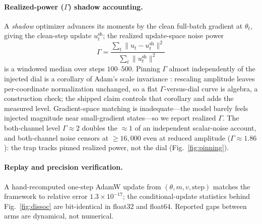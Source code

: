 \paragraph{Realized-power ($\Gamma$) shadow accounting.}
A \emph{shadow} optimizer advances its moments by the clean full-batch gradient at $\theta_t$, giving the clean-step update $u^{\mathrm{sh}}_t$; the realized update-space noise power
\[
\Gamma=\frac{\sum_t\lVert u_t-u^{\mathrm{sh}}_t\rVert^2}{\sum_t\lVert u^{\mathrm{sh}}_t\rVert^2}
\]
is a windowed median over steps $100$--$500$. Pinning $\Gamma$ almost independently of the injected dial is a corollary of Adam's scale invariance \citep{adam}: rescaling amplitude leaves per-coordinate normalization unchanged, so a flat $\Gamma$-versus-dial curve is algebra, a construction check; the shipped claim controls that corollary and adds the measured level. Gradient-space matching is inadequate---the model barely feels injected magnitude near small-gradient states---so we report realized $\Gamma$. The both-channel level $\Gamma\!\approx\!2$ doubles the $\approx\!1$ of an independent scalar-noise account, and both-channel noise censors at $\ge16{,}000$ even at reduced amplitude ($\Gamma\!\approx\!1.86$): the trap tracks pinned realized power, not the dial (Fig.~\ref{fig:pinning}).

\paragraph{Replay and precision verification.}
A hand-recomputed one-step AdamW update from $(\theta,m,v,\text{step})$ matches the framework to relative error $1.3\times10^{-17}$; the conditional-update statistics behind Fig.~\ref{fig:dissoc} are bit-identical in float32 and float64. Reported gaps between arms are dynamical, not numerical.